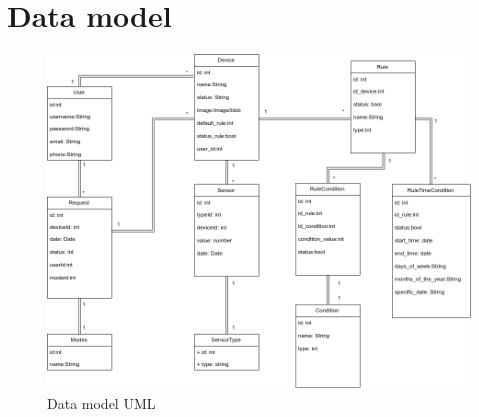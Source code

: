 \documentclass[11pt,a4paper]{article}
\begin{document}
\section{Data model}
\begin{figure}[hbtp]
\centering
\includegraphics[scale=0.5]{figures/ModelDeDades.png}
\caption{Data model UML}
\end{figure}
\end{document}
